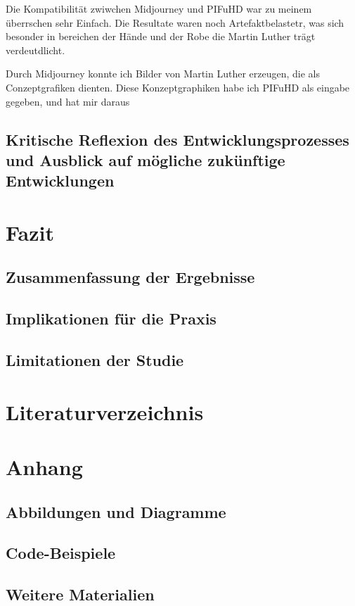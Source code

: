 \documentclass[12pt,a4paper,bibliography=totocnumbered,listof=totocnumbered]{scrartcl}
\begin{document}
Die Kompatibilität zwiwchen Midjourney und PIFuHD war zu meinem überrschen sehr Einfach. Die Resultate waren noch Artefaktbelastetr, was sich besonder in bereichen der Hände und der Robe die Martin Luther trägt verdeutdlicht.

Durch Midjourney konnte ich Bilder von  Martin Luther erzeugen, die als Conzeptgrafiken dienten. Diese Konzeptgraphiken habe ich PIFuHD als eingabe gegeben, und hat mir daraus
\subsection{Kritische Reflexion des Entwicklungsprozesses und Ausblick auf mögliche zukünftige Entwicklungen}

\section{Fazit}
\subsection{Zusammenfassung der Ergebnisse}
\subsection{Implikationen für die Praxis}
\subsection{Limitationen der Studie}

\section{Literaturverzeichnis}

\section{Anhang}
\subsection{Abbildungen und Diagramme}
\subsection{Code-Beispiele}
\subsection{Weitere Materialien}
\end{document}
